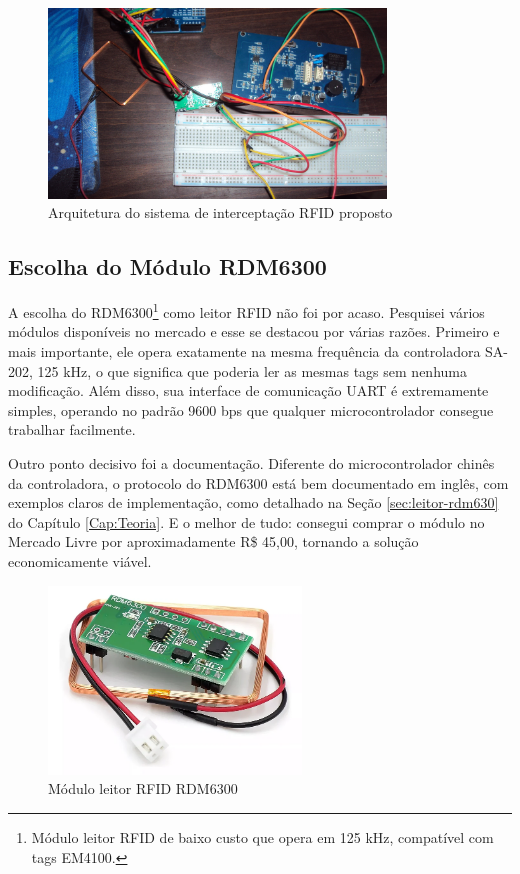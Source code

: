 \begin{figure}[htbp!]
\centering
\includegraphics[width=0.8\textwidth]{pre-textuais/figuras/EsquemadeLigaçãoRDMSA202.JPG}
\caption{Arquitetura do sistema de interceptação RFID proposto}
\label{fig:arquitetura}
\end{figure}

\subsection{Escolha do Módulo RDM6300}

A escolha do RDM6300\footnote{Módulo leitor RFID de baixo custo que opera em 125 kHz, compatível com tags EM4100.} como leitor RFID não foi por acaso. Pesquisei vários módulos disponíveis no mercado e esse se destacou por várias razões. Primeiro e mais importante, ele opera exatamente na mesma frequência da controladora SA-202, 125 kHz, o que significa que poderia ler as mesmas tags sem nenhuma modificação. Além disso, sua interface de comunicação UART é extremamente simples, operando no padrão 9600 bps que qualquer microcontrolador consegue trabalhar facilmente.

Outro ponto decisivo foi a documentação. Diferente do microcontrolador chinês da controladora, o protocolo do RDM6300 está bem documentado em inglês, com exemplos claros de implementação, como detalhado na Seção \ref{sec:leitor-rdm630} do Capítulo \ref{Cap:Teoria}. E o melhor de tudo: consegui comprar o módulo no Mercado Livre por aproximadamente R\$ 45,00, tornando a solução economicamente viável.

\begin{figure}[htbp!]
\centering
\includegraphics[width=0.6\textwidth]{pre-textuais/figuras/RDM6300PNG.png}
\caption{Módulo leitor RFID RDM6300}
\label{fig:rdm6300}
\end{figure}

